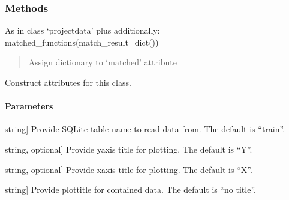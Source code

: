 \documentclass[letterpaper,10pt,english]{sphinxmanual}
\begin{document}
\begin{fulllineitems}
\subsubsection{Methods}
\label{\detokenize{_autosummary/functionfinder.classes.idealdata:methods}}
\sphinxAtStartPar
As in class ‘projectdata’ plus additionally:
matched\_functions(match\_result=dict())
\begin{quote}

\sphinxAtStartPar
Assign dictionary to ‘matched’ attribute
\end{quote}

\begin{fulllineitems}
\label{\detokenize{_autosummary/functionfinder.classes.idealdata:functionfinder.classes.idealdata.__init__}}
\pysigstartsignatures
{}
\pysigstopsignatures
\sphinxAtStartPar
Construct attributes for this class.


\paragraph{Parameters}
\label{\detokenize{_autosummary/functionfinder.classes.idealdata:parameters}}\begin{description}
\sphinxlineitem{dataname}{[}string{]}
\sphinxAtStartPar
Provide SQLite table name to read data from.
The default is “train”.

\sphinxlineitem{ylabel}{[}string, optional{]}
\sphinxAtStartPar
Provide y\sphinxhyphen{}axis title for plotting. The default is “Y”.

\sphinxlineitem{xlabel}{[}string, optional{]}
\sphinxAtStartPar
Provide x\sphinxhyphen{}axis title for plotting. The default is “X”.

\sphinxlineitem{plottitle}{[}string{]}
\sphinxAtStartPar
Provide plot\sphinxhyphen{}title for contained data. The default is “no title”.


\end{description}
\end{fulllineitems}
\end{fulllineitems}
\end{document}
